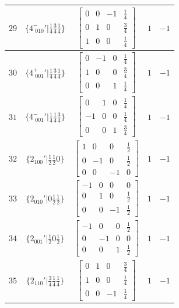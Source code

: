 \documentclass[fleqn,8pt]{jsarticle}
\begin{document}
\begin{longtable}{ccccc}
$ 29 $ & $ \{4^{-}_{\,\,010}{}'|\frac{1}{4} \frac{3}{4} \frac{1}{4}\} $ & $ \begin{bmatrix} 0 & 0 & -1 & \frac{1}{4} \\ 0 & 1 & 0 & \frac{3}{4} \\ 1 & 0 & 0 & \frac{1}{4} \end{bmatrix} $ & $ 1 $ & $ -1 $ \\ \hline
$ 30 $ & $ \{4^{+}_{\,\,001}{}'|\frac{1}{4} \frac{3}{4} \frac{1}{4}\} $ & $ \begin{bmatrix} 0 & -1 & 0 & \frac{1}{4} \\ 1 & 0 & 0 & \frac{3}{4} \\ 0 & 0 & 1 & \frac{1}{4} \end{bmatrix} $ & $ 1 $ & $ -1 $ \\ \hline
$ 31 $ & $ \{4^{-}_{\,\,001}{}'|\frac{1}{4} \frac{1}{4} \frac{3}{4}\} $ & $ \begin{bmatrix} 0 & 1 & 0 & \frac{1}{4} \\ -1 & 0 & 0 & \frac{1}{4} \\ 0 & 0 & 1 & \frac{3}{4} \end{bmatrix} $ & $ 1 $ & $ -1 $ \\ \hline
$ 32 $ & $ \{2{}_{100}{}'|\frac{1}{2} \frac{1}{2} 0\} $ & $ \begin{bmatrix} 1 & 0 & 0 & \frac{1}{2} \\ 0 & -1 & 0 & \frac{1}{2} \\ 0 & 0 & -1 & 0 \end{bmatrix} $ & $ 1 $ & $ -1 $ \\ \hline
$ 33 $ & $ \{2{}_{010}{}'|0 \frac{1}{2} \frac{1}{2}\} $ & $ \begin{bmatrix} -1 & 0 & 0 & 0 \\ 0 & 1 & 0 & \frac{1}{2} \\ 0 & 0 & -1 & \frac{1}{2} \end{bmatrix} $ & $ 1 $ & $ -1 $ \\ \hline
$ 34 $ & $ \{2{}_{001}{}'|\frac{1}{2} 0 \frac{1}{2}\} $ & $ \begin{bmatrix} -1 & 0 & 0 & \frac{1}{2} \\ 0 & -1 & 0 & 0 \\ 0 & 0 & 1 & \frac{1}{2} \end{bmatrix} $ & $ 1 $ & $ -1 $ \\ \hline
$ 35 $ & $ \{2{}_{110}{}'|\frac{3}{4} \frac{1}{4} \frac{1}{4}\} $ & $ \begin{bmatrix} 0 & 1 & 0 & \frac{3}{4} \\ 1 & 0 & 0 & \frac{1}{4} \\ 0 & 0 & -1 & \frac{1}{4} \end{bmatrix} $ & $ 1 $ & $ -1 $ \\ \hline

\end{longtable}
\end{document}
